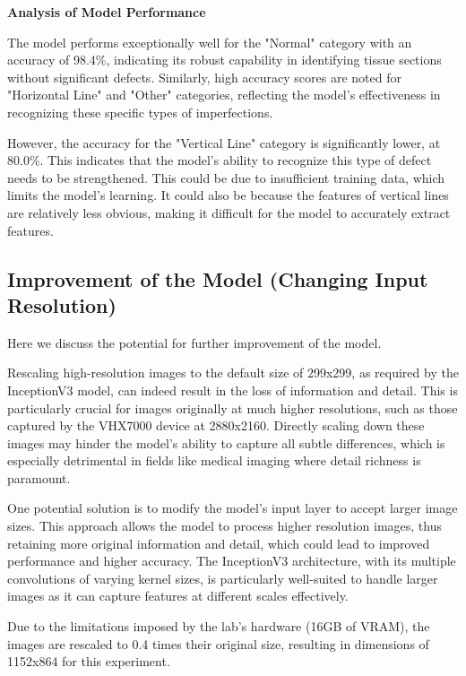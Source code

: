 \textbf{Analysis of Model Performance}

The model performs exceptionally well for the "Normal" category with an accuracy of 98.4\%, indicating its robust capability in identifying tissue sections without significant defects. Similarly, high accuracy scores are noted for "Horizontal Line" and "Other" categories, reflecting the model's effectiveness in recognizing these specific types of imperfections.

However, the accuracy for the "Vertical Line" category is significantly lower, at 80.0\%. This indicates that the model's ability to recognize this type of defect needs to be strengthened. This could be due to insufficient training data, which limits the model's learning. It could also be because the features of vertical lines are relatively less obvious, making it difficult for the model to accurately extract features.

\subsection{Improvement of the Model (Changing Input Resolution)}

Here we discuss the potential for further improvement of the model.

Rescaling high-resolution images to the default size of 299x299, as required by the InceptionV3 model, can indeed result in the loss of information and detail. This is particularly crucial for images originally at much higher resolutions, such as those captured by the VHX7000 device at 2880x2160. Directly scaling down these images may hinder the model's ability to capture all subtle differences, which is especially detrimental in fields like medical imaging where detail richness is paramount.

One potential solution is to modify the model's input layer to accept larger image sizes. This approach allows the model to process higher resolution images, thus retaining more original information and detail, which could lead to improved performance and higher accuracy. The InceptionV3 architecture, with its multiple convolutions of varying kernel sizes, is particularly well-suited to handle larger images as it can capture features at different scales effectively.

Due to the limitations imposed by the lab's hardware (16GB of VRAM), the images are rescaled to 0.4 times their original size, resulting in dimensions of 1152x864 for this experiment.


